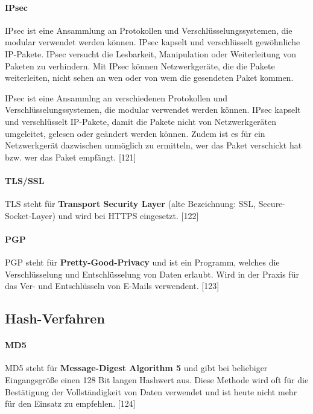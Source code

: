 \documentclass[12pt,a4paper]{report}
\begin{document}
\begin{onehalfspace}
\paragraph{IPsec}

IPsec ist eine Ansammlung an Protokollen und Verschlüsselungssystemen, die modular verwendet werden können. IPsec kapselt und verschlüsselt gewöhnliche IP-Pakete. IPsec versucht die Lesbarkeit, Manipulation oder Weiterleitung von Paketen zu verhindern. Mit IPsec können Netzwerkgeräte, die die Pakete weiterleiten, nicht sehen an wen oder von wem die gesendeten Paket kommen.

IPsec ist eine Ansammlng an verschiedenen Protokollen und Verschlüsselungssystemen, die modular verwendet werden können. IPsec kapselt und verschlüsselt IP-Pakete, damit die Pakete nicht von Netzwerkgeräten umgeleitet, gelesen oder geändert werden können. Zudem ist es für ein Netzwerkgerät dazwischen unmöglich zu ermitteln, wer das Paket verschickt hat bzw. wer das Paket empfängt. [121]

\paragraph{TLS/SSL}

TLS steht für \textbf{Transport Security Layer} (alte Bezeichnung: SSL, Secure-Socket-Layer) und wird bei HTTPS eingesetzt. [122]

\paragraph{PGP}

PGP steht für \textbf{Pretty-Good-Privacy} und ist ein Programm, welches die Verschlüsselung und Entschlüsselung von Daten erlaubt. Wird in der Praxis für das Ver- und Entschlüsseln von E-Mails verwendent. [123]

\subsection{Hash-Verfahren}

\paragraph{MD5}

MD5 steht für \textbf{Message-Digest Algorithm 5} und gibt bei beliebiger Eingangsgröße einen 128 Bit langen Hashwert aus. Diese Methode wird oft für die Bestätigung der Vollständigkeit von Daten verwendet und ist heute nicht mehr für den Einsatz zu empfehlen. [124]


\end{onehalfspace}
\end{document}

